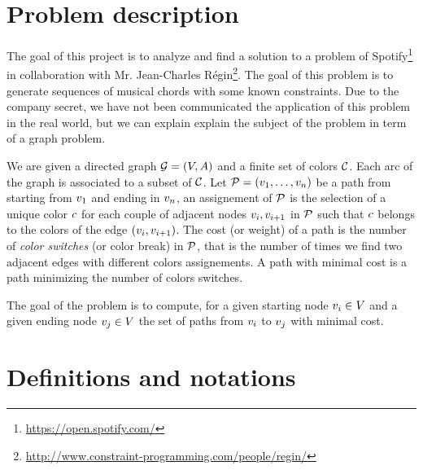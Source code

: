 \section{Problem description}

The goal of this project is to analyze and find a solution to a problem of Spotify\footnote{\url{https://open.spotify.com/}} in collaboration with Mr. Jean-Charles Régin\footnote{\url{http://www.constraint-programming.com/people/regin/}}. The goal of this problem is to generate sequences of musical chords with some known constraints. Due to the company secret, we have not been communicated the application of this problem in the real world, but we can explain explain the subject of the problem in term of a graph problem.

We are given a directed graph $\mathcal{G} = (V, A)$ and a finite set of colors $\mathcal{C}$. Each arc of the graph is associated to a subset of $\mathcal{C}$. Let $\mathcal{P} = (v_1,\ldots,v_{n})$ be a path from starting from $v_1$ and ending in $v_n$, an assignement of $\mathcal{P}$ is the selection of a unique color $c$ for each couple of adjacent nodes $v_i, v_{i+1}$ in $\mathcal{P}$ such that $c$ belongs to the colors of the edge $(v_i, v_{i+1})$. The cost (or weight) of a path is the number of \textit{color switches} (or color break) in $\mathcal{P}$, that is the number of times we find two adjacent edges with different colors assignements. A path with minimal cost is a path minimizing the number of colors switches.

The goal of the problem is to compute, for a given starting node $v_i \in V$ and a given ending node $v_j \in V$ the set of paths from $v_i$ to $v_j$ with minimal cost.

\section{Definitions and notations}

